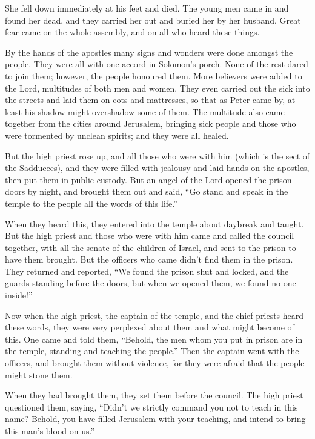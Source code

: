  She fell down immediately at his feet and died. The young
men came in and found her dead, and they carried her out and buried her
by her husband.  Great fear came on the whole assembly, and
on all who heard these things.

 By the hands of the apostles many signs and wonders were
done amongst the people. They were all with one accord in Solomon's
porch.  None of the rest dared to join them; however, the
people honoured them.  More believers were added to the
Lord, multitudes of both men and women.  They even carried
out the sick into the streets and laid them on cots and mattresses, so
that as Peter came by, at least his shadow might overshadow some of
them.  The multitude also came together from the cities
around Jerusalem, bringing sick people and those who were tormented by
unclean spirits; and they were all healed.

 But the high priest rose up, and all those who were with
him (which is the sect of the Sadducees), and they were filled with
jealousy  and laid hands on the apostles, then put them in
public custody.  But an angel of the Lord opened the prison
doors by night, and brought them out and said,  ``Go stand
and speak in the temple to the people all the words of this life.''

 When they heard this, they entered into the temple about
daybreak and taught. But the high priest and those who were with him
came and called the council together, with all the senate of the
children of Israel, and sent to the prison to have them brought.
 But the officers who came didn't find them in the prison.
They returned and reported,  ``We found the prison shut and
locked, and the guards standing before the doors, but when we opened
them, we found no one inside!''

 Now when the high priest, the captain of the temple, and
the chief priests heard these words, they were very perplexed about them
and what might become of this.  One came and told them,
``Behold, the men whom you put in prison are in the temple, standing and
teaching the people.''  Then the captain went with the
officers, and brought them without violence, for they were afraid that
the people might stone them.

 When they had brought them, they set them before the
council. The high priest questioned them,  saying, ``Didn't
we strictly command you not to teach in this name? Behold, you have
filled Jerusalem with your teaching, and intend to bring this man's
blood on us.''


